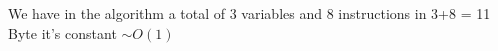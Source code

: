 We have in the algorithm a total of 3 variables and 8 instructions in 
3+8 = 11 Byte it's constant \(\sim O(1)\)
